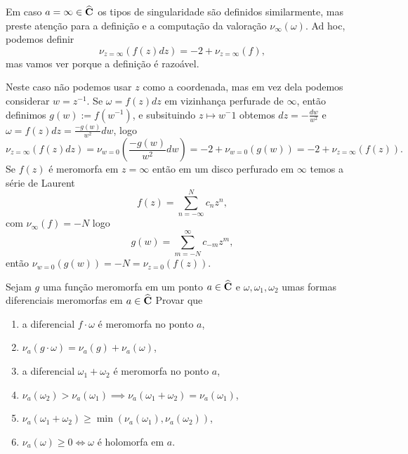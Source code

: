 Em caso $a=\infty\in\widehat{\mathbf{C}}$ os tipos de singularidade são definidos similarmente,
mas preste atenção para a definição e a computação da valoração $\nu_\infty(\omega)$.
Ad hoc, podemos definir 
\begin{equation}
\nu_{z=\infty}(f(z) dz) = -2 + \nu_{z=\infty}(f),
\end{equation}
mas vamos ver porque a definição é razoável.

Neste caso não podemos usar $z$ como a coordenada,
mas em vez dela podemos considerar $w = z^{-1}$. 
Se $\omega = f(z) dz$ em vizinhança perfurade de $\infty$, então
definimos $g(w) := f(w^{-1})$, e 
subsituindo $z\mapsto w^-1$
obtemos
$dz = -\frac{dw}{w^2}$ e $\omega = f(z) dz = \frac{-g(w)}{w^2} dw$,
logo 
\[ \nu_{z=\infty} (f(z) dz) = \nu_{w=0} (\frac{-g(w)}{w^2} dw) 
 = -2 + \nu_{w=0} (g(w)) = -2 + \nu_{z=\infty} (f(z)). \]
Se $f(z)$ é meromorfa em $z = \infty$ então em um disco perfurado em $\infty$ temos a série de Laurent
\[ f(z) = \sum_{n=-\infty}^N c_n z^n, \]
com $\nu_\infty(f) = -N$
logo
\[ g(w) = \sum_{m=-N}^\infty c_{-m} z^m, \]
então $\nu_{w=0} (g(w)) = -N = \nu_{z=0} (f(z))$.

\begin{problema}
Sejam $g$ uma função meromorfa em um ponto $a\in\widehat{\mathbf{C}}$
e $\omega,\omega_1,\omega_2$ umas formas diferenciais meromorfas em $a\in\widehat{\mathbf{C}}$
Provar que
\begin{enumerate}
\item a diferencial $f\cdot \omega$ é meromorfa no ponto $a$,
\item $\nu_a(g\cdot \omega) = \nu_a(g) + \nu_a(\omega)$,
\item a diferencial $\omega_1 + \omega_2$ é meromorfa no ponto $a$,
\item $\nu_a(\omega_2) > \nu_a(\omega_1) \implies \nu_a(\omega_1+\omega_2) = \nu_a(\omega_1)$,
\item $\nu_a(\omega_1 + \omega_2) \geq \min(\nu_a(\omega_1), \nu_a(\omega_2))$,
\item $\nu_a(\omega) \geq 0 \iff \omega$ é holomorfa em $a$.
\end{enumerate}
\end{problema}


